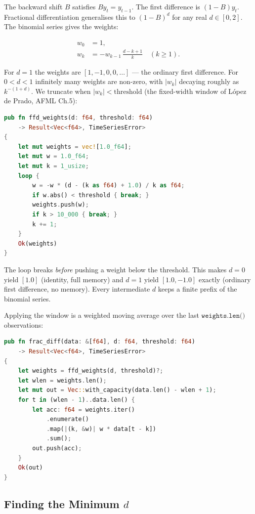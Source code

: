 The backward shift $B$ satisfies $B y_t = y_{t-1}$. The first difference is
$(1 - B) y_t$. Fractional differentiation generalises this to
$(1 - B)^d$ for any real $d \in [0, 2]$. The binomial series gives the weights:

\begin{align*}
w_0 &= 1, \\
w_k &= -w_{k-1}\, \frac{d - k + 1}{k} \quad (k \geq 1).
\end{align*}

For $d = 1$ the weights are $[1, -1, 0, 0, \ldots]$ --- the ordinary first
difference. For $0 < d < 1$ infinitely many weights are non-zero, with
$|w_k|$ decaying roughly as $k^{-(1 + d)}$. We truncate when
$|w_k| < \text{threshold}$ (the fixed-width window of López de Prado, AFML
Ch.5):

\begin{lstlisting}[language=Rust]
pub fn ffd_weights(d: f64, threshold: f64)
    -> Result<Vec<f64>, TimeSeriesError>
{
    let mut weights = vec![1.0_f64];
    let mut w = 1.0_f64;
    let mut k = 1_usize;
    loop {
        w = -w * (d - (k as f64) + 1.0) / k as f64;
        if w.abs() < threshold { break; }
        weights.push(w);
        if k > 10_000 { break; }
        k += 1;
    }
    Ok(weights)
}
\end{lstlisting}

\begin{keyinsight}
The loop breaks \emph{before} pushing a weight below the threshold. This
makes $d = 0$ yield $[1.0]$ (identity, full memory) and $d = 1$ yield
$[1.0, -1.0]$ exactly (ordinary first difference, no memory). Every
intermediate $d$ keeps a finite prefix of the binomial series.
\end{keyinsight}

Applying the window is a weighted moving average over the last
$\texttt{weights.len()}$ observations:

\begin{lstlisting}[language=Rust]
pub fn frac_diff(data: &[f64], d: f64, threshold: f64)
    -> Result<Vec<f64>, TimeSeriesError>
{
    let weights = ffd_weights(d, threshold)?;
    let wlen = weights.len();
    let mut out = Vec::with_capacity(data.len() - wlen + 1);
    for t in (wlen - 1)..data.len() {
        let acc: f64 = weights.iter()
            .enumerate()
            .map(|(k, &w)| w * data[t - k])
            .sum();
        out.push(acc);
    }
    Ok(out)
}
\end{lstlisting}

\subsection{Finding the Minimum $d$}


